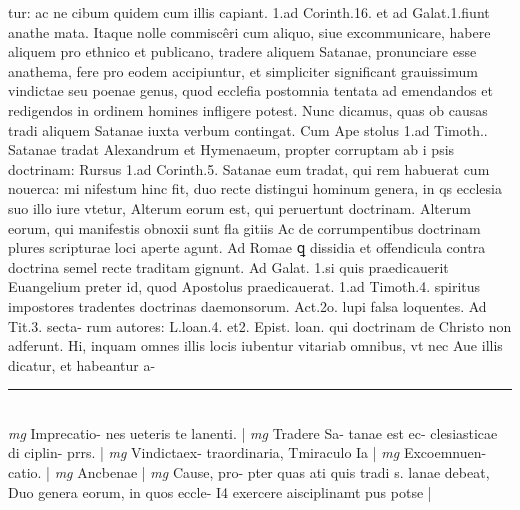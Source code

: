 \documentclass{article}
\begin{document}
\begin{pages}
tur: ac ne cibum quidem cum illis capiant. 1.ad Corinth.16. et ad Galat.1.fiunt anathe mata. Itaque  nolle commiscêri cum aliquo, siue excommunicare, habere aliquem pro ethnico et publicano, tradere aliquem Satanae, pronunciare esse anathema, fere pro eodem accipiuntur, et simpliciter significant grauissimum vindictae seu poenae genus, quod ecclefia postomnia tentata ad emendandos et redigendos in ordinem homines infligere potest.  \pend\pstart Nunc dicamus, quas ob causas tradi aliquem Satanae iuxta verbum contingat. Cum Ape stolus 1.ad Timoth.. Satanae tradat Alexandrum et Hymenaeum, propter corruptam ab i psis doctrinam: Rursus 1.ad Corinth.5. Satanae eum tradat, qui rem habuerat cum nouerca: mi nifestum hinc fit, duo recte distingui hominum genera, in qs ecclesia suo illo iure vtetur, Alterum eorum est, qui peruertunt doctrinam. Alterum eorum, qui manifestis obnoxii sunt fla gitiis Ac de corrumpentibus  doctrinam plures scripturae loci aperte agunt. Ad Romae ꝗ dissidia et offendicula contra doctrina semel recte traditam gignunt. Ad Galat. 1.si quis praedicauerit Euangelium preter id, quod Apostolus praedicauerat. 1.ad Timoth.4. spiritus impostores tradentes doctrinas daemonsorum. Act.2o. lupi falsa loquentes. Ad Tit.3. secta- rum autores: L.loan.4. et2. Epist. loan. qui doctrinam de Christo non adferunt. Hi, inquam omnes illis locis iubentur vitariab omnibus, vt nec Aue illis dicatur, et habeantur a-  \pend
\vspace{0.5cm}\noindent
\vspace{0.2cm}\rule{1cm}{0.2pt}\\ 
\hspace{0.2cm}\textit{mg}
\footnotesize Imprecatio- nes ueteris te lanenti. 
\normalsize| 
\hspace{0.2cm}\textit{mg}
\footnotesize Tradere Sa- tanae est ec- clesiasticae di ciplin- prrs. 
\normalsize| 
\hspace{0.2cm}\textit{mg}
\footnotesize Vindictaex- traordinaria, Tmiraculo Ia 
\normalsize| 
\hspace{0.2cm}\textit{mg}
\footnotesize Excoemnuen- catio. 
\normalsize| 
\hspace{0.2cm}\textit{mg}
\footnotesize Ancbenae 
\normalsize| 
\hspace{0.2cm}\textit{mg}
\footnotesize Cause, pro- pter quas ati quis tradi s. lanae debeat, Duo genera eorum, in quos eccle- I4 exercere aisciplinamt pus potse 
\normalsize| 

\end{pages}
\end{document}
